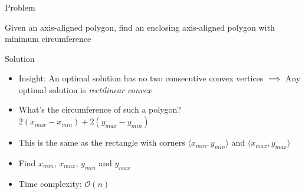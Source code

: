 \begin{frame}
    \frametitle{\problemtitle}
	\begin{block}{Problem}

         Given an axis-aligned polygon, find an enclosing axis-aligned polygon with minimum circumference
	\end{block}
	 \begin{block}{Solution}
    \begin{itemize}
        \item Insight: An optimal solution has no two consecutive convex vertices
        \newline $\implies$ Any optimal solution is \emph{rectilinear convex}
        \item What's the circumference of such a polygon? \pause $2(x_\mathit{max} - x_\mathit{min}) + 2(y_\mathit{max} - y_\mathit{min})$
        \item This is the same as the rectangle with corners $\langle x_\mathit{min},y_\mathit{min}\rangle$ and $\langle x_\mathit{max},y_\mathit{max}\rangle$
        \item Find $x_\mathit{min}$, $x_\mathit{max}$, $y_\mathit{min}$ and $y_\mathit{max}$
        \item Time complexity: $\mathcal{O}(n)$
    \end{itemize}
	\end{block}
\end{frame}

